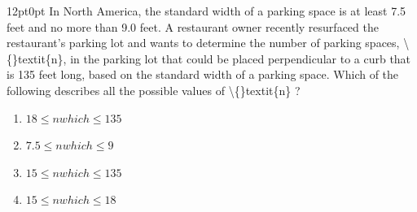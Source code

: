 \documentclass[11pt, twocolumn]{article}
\newcounter{questionnum}
\begin{document}
\vspace{6pt}\noindent
\begin{minipage}{\columnwidth}\raggedright
\noindent{}\par\vspace{8pt}
\begin{adjustwidth}{12pt}{0pt}
In North America, the standard width of a parking space is at least 7.5 feet and no more than 9.0 feet. A restaurant owner recently resurfaced the restaurant's parking lot and wants to determine the number of parking spaces, \textbackslash\{\}textit\{n\}, in the parking lot that could be placed perpendicular to a curb that is 135 feet long, based on the standard width of a parking space. Which of the following describes all the possible values of \textbackslash\{\}textit\{n\} ?
\begin{enumerate}[label=\Alph*),leftmargin=18pt,topsep=3pt,itemsep=2pt]
  \item $18 \leq n which \leq 135$
  \item $7 . 5 \leq n which \leq 9$
  \item $15 \leq n which \leq 135$
  \item $15 \leq n which \leq 18$
\end{enumerate}
\end{adjustwidth}
\end{minipage}\par
\end{document}
